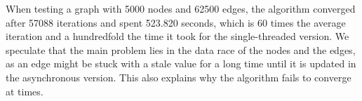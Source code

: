 When testing a graph with 5000 nodes and 62500 edges, the algorithm converged after 57088 iterations and spent 523.820 seconds, which is 60 times the average iteration and a hundredfold the time it took for the single-threaded version. We speculate that the main problem lies in the data race of the nodes and the edges, as an edge might be stuck with a stale value for a long time until it is updated in the asynchronous version. This also explains why the algorithm fails to converge at times.

